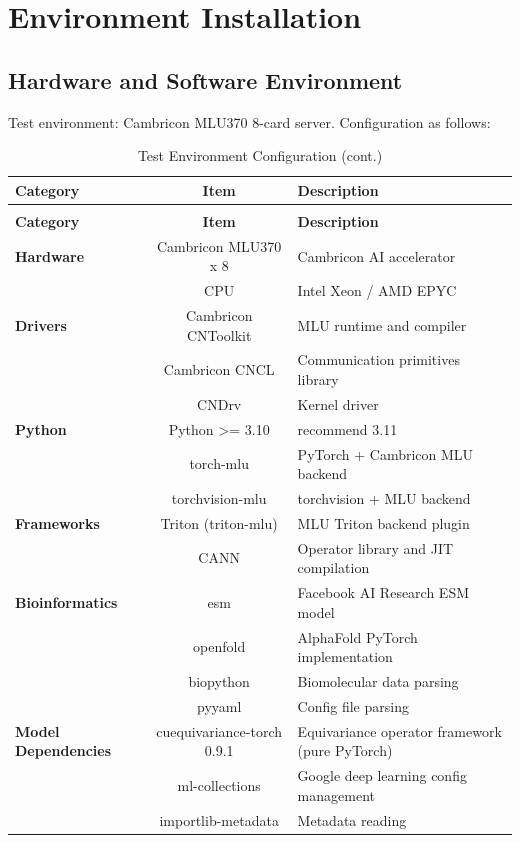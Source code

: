 \documentclass[12pt,a4paper]{article}
\begin{document}
\section{Environment Installation}

\subsection{Hardware and Software Environment}

Test environment: Cambricon MLU370 8-card server. Configuration as follows:

\begin{longtable}{lcl}
    \caption{Test Environment Configuration} \\
    \toprule
    \textbf{Category} & \textbf{Item} & \textbf{Description} \\
    \midrule
    \endfirsthead
    \caption[]{Test Environment Configuration (cont.)} \\
    \toprule
    \textbf{Category} & \textbf{Item} & \textbf{Description} \\
    \midrule
    \endhead
    \bottomrule
    \endfoot
    \endlastfoot

    \textbf{Hardware} & Cambricon MLU370 x 8 & Cambricon AI accelerator \\
                      & CPU & Intel Xeon / AMD EPYC \\
    \midrule
    \textbf{Drivers} & Cambricon CNToolkit & MLU runtime and compiler \\
                      & Cambricon CNCL & Communication primitives library \\
                      & CNDrv & Kernel driver \\
    \midrule
    \textbf{Python} & Python >= 3.10 & recommend 3.11 \\
                    & torch-mlu & PyTorch + Cambricon MLU backend \\
                    & torchvision-mlu & torchvision + MLU backend \\
    \midrule
    \textbf{Frameworks} & Triton (triton-mlu) & MLU Triton backend plugin \\
                        & CANN & Operator library and JIT compilation \\
    \midrule
    \textbf{Bioinformatics} & esm & Facebook AI Research ESM model \\
                            & openfold & AlphaFold PyTorch implementation \\
                            & biopython & Biomolecular data parsing \\
                            & pyyaml & Config file parsing \\
    \midrule
    \textbf{Model Dependencies} & cuequivariance-torch 0.9.1 & Equivariance operator framework (pure PyTorch) \\
                                 & ml-collections & Google deep learning config management \\
                                 & importlib-metadata & Metadata reading \\
\end{longtable}
\end{document}
